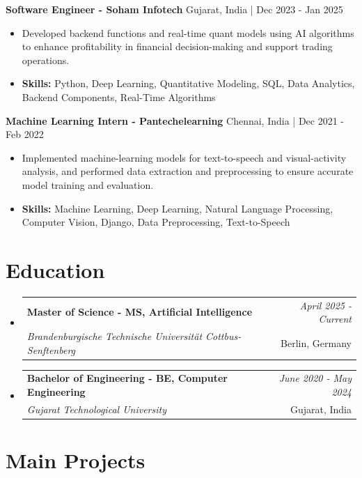 \documentclass[a4paper,11pt]{article}
\makeatletter
\newcommand{\resumeSubheading}[4]{
\vspace{0.5mm}\item
    \begin{tabular*}{\linewidth}[t]{l@{\extracolsep{\fill}}r}
        \textbf{#1} & \textit{\footnotesize{#4}} \\
        \textit{\footnotesize{#3}} &  \footnotesize{#2}\\
    \end{tabular*}
    \vspace{-2.4mm}
}
\makeatother
\begin{document}
\vspace{1mm}
  \textbf{Software Engineer - Soham Infotech} \hfill Gujarat, India | Dec 2023 - Jan 2025
\vspace{-1.5mm} %
\begin{itemize}
  \item Developed backend functions and real-time quant models using AI algorithms to enhance profitability in financial decision-making and support trading operations.

\vspace{-2mm}
  \item \textbf{Skills:} Python, Deep Learning, Quantitative Modeling, SQL, Data Analytics, Backend Components, Real-Time Algorithms
\end{itemize}

\vspace{1mm}
  \textbf{Machine Learning Intern - Pantechelearning} \hfill Chennai, India | Dec 2021 - Feb 2022
\vspace{-1.5mm} %
\begin{itemize}
  \item Implemented machine-learning models for text-to-speech and visual-activity analysis, and performed data extraction and preprocessing to ensure accurate model training and evaluation.
\vspace{-2mm}
  \item \textbf{Skills:} Machine Learning, Deep Learning, Natural Language Processing, Computer Vision, Django, Data Preprocessing, Text-to-Speech
\end{itemize}\section{\textbf{Education}}
\vspace{-0.4mm}

\begin{itemize}[leftmargin=0.15in, label={}]
\resumeSubheading
{Master of Science - MS, Artificial Intelligence }{Berlin, Germany}
{Brandenburgische Technische Universität Cottbus-Senftenberg  }{April 2025 - Current}

\vspace{1.0mm} %
\resumeSubheading
{Bachelor of Engineering - BE, Computer Engineering  }{Gujarat, India}
{Gujarat Technological University }{June 2020 - May 2024}

\end{itemize}
\section{\textbf{Main Projects}}
\end{document}
